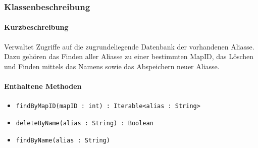 \subsubsection*{Klassenbeschreibung}%
\paragraph*{Kurzbeschreibung}
Verwaltet Zugriffe auf die zugrundeliegende Datenbank der vorhandenen Aliasse.
Dazu gehören das Finden aller Aliasse zu einer bestimmten MapID, das Löschen und Finden mittels das Namens sowie
das Abspeichern neuer Aliasse.
\paragraph*{Enthaltene Methoden}
\begin{itemize}
    \item \texttt{findByMapID(mapID : int) : Iterable<alias : String>}
    \item \texttt{deleteByName(alias : String) : Boolean}
    \item \texttt{findByName(alias : String)}
\end{itemize}
